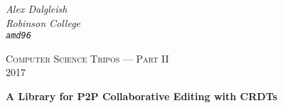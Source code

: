 \documentclass[12pt,a4paper]{report}
\begin{document}
 
  \begin{titlepage}
      \begin{flushright}
        \large
        \textit{Alex Dalgleish}
        \\
        \textit{Robinson College}
        \\
        \texttt{\textit{amd96}}
      \end{flushright}


    \vfill

    \begin{center}

      {\scshape Computer Science Tripos --- Part II}\\
      {\scshape 2017}
 
      {\huge\bfseries A Library for P2P Collaborative Editing with CRDTs\par}

    \vfill
    
    

    \end{center}
  \end{titlepage}\newpage
  \pagestyle{plain}\mbox{}\newpage
  


\tableofcontents







  
\end{document}
